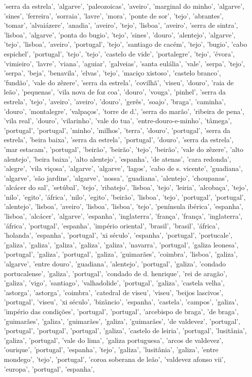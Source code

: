 \documentclass{article}
\begin{document}
\begin{itemize}
'serra da estrela', 'algarve', 'paleozoicas', 'aveiro', 'marginal do minho', 'algarve', 'sines', 'ferreira', 'sorraia', 'lavre', 'mora', 'ponte de sor', 'tejo', 'abrantes', 'tomar', 'alvaiázere', 'anadia', 'aveiro', 'tejo', 'lisboa', 'aveiro', 'serra de sintra', 'lisboa', 'algarve', 'ponta do bugio', 'tejo', 'sines', 'douro', 'alentejo', 'algarve', 'tejo', 'lisboa', 'aveiro', 'portugal', 'tejo', 'santiago de cacém', 'tejo', 'bugio', 'cabo espichel', 'portugal', 'tejo', 'tejo', 'castelo de vide', 'portalegre', 'tejo', 'évora', 'vimieiro', 'lavre', 'viana', 'aguiar', 'galveias', 'santa eulália', 'vale', 'serpa', 'tejo', 'serpa', 'beja', 'benavila', 'elvas', 'tejo', 'maciço xistoso', 'castelo branco', 'fundão', 'vale do zêzere', 'serra da estrela', 'covilhã', 'viseu', 'douro', 'raia de leão', 'pequenas', 'vila nova de foz coa', 'douro', 'vouga', 'pinhel', 'serra da estrela', 'tejo', 'aveiro', 'aveiro', 'douro', 'gerês', 'soajo', 'braga', 'caminha', 'douro', 'montalegre', 'valpaços', 'torre de d.', 'serra do marão', 'ribeira de pena', 'vila real', 'douro', 'vilarinho', 'vale do tua', 'entre-douro-e-minho', 'tâmega', 'portugal', 'portugal', 'minho', 'milhos', 'terra', 'douro', 'portugal', 'serra da estrela', 'beira baixa', 'serra da estrela', 'portugal', 'douro', 'serra da estrela', 'mar estacam', 'portugal', 'beirão', 'beirão', 'tejo', 'beirão', 'vale do zêzere', 'alto alentejo', 'beira baixa', 'alto alentejo', 'espanha', 'de atenas', 'cara redonda', 'alegre', 'vila viçosa', 'algarve', 'algarve', 'lagos', 'cabo de s. vicente', 'guadiana', 'algarve', 'são jardins', 'algarve', 'nossa', 'guadiana', 'alentejo', 'choupanas', 'alcácer do sal', 'setúbal', 'tejo', 'ribatejo', 'lisboa', 'tejo', 'leiria', 'alcobaça', 'tejo', 'nilo', 'egito', 'áfrica', 'nilo', 'egito', 'beirão', 'lisboa', 'tejo', 'portugal', 'portugal', 'alentejo', 'lisboa', 'aveiro', 'lisboa', 'lisboa', 'tejo', 'península ibérica', 'espanha', 'lisboa', 'alcácer', 'algarve', 'espanha', 'inglaterra', 'frança', 'frança', 'inglaterra', 'áfrica', 'portugal', 'espanha', 'império oriental', 'brasil', 'brasil', 'áfrica', 'holanda', 'espanha', 'portugal', 'xi século', 'espanha', 'portugal', 'portucale', 'galiza', 'galiza', 'galiza', 'galiza', 'galiza', 'navarra', 'portugal', 'galiza leonesa', 'portugal', 'galiza', 'portugal', 'galiza', 'guimarães', 'coimbra', 'lisboa', 'galiza', 'algarve', 'entre douro', 'guadiana', 'alentejo', 'portugal', 'galiza', 'condado portucalense', 'galiza', 'portugal', 'condado de d. henrique', 'rei de aragão', 'galiza', 'vigo', 'santiago', 'valhadolide', 'portugal', 'galiza', 'castela velha', 'astorga', 'astorga', 'coimbra', 'catedral de viseu', 'viseu', 'beijos lascivos', 'portugal', 'viseu', 'xi século', 'bizâncio', 'espanha', 'castela', 'campos', 'galiza', 'império das condições', 'portugal', 'portugal', 'arcebispo de braga', 'de braga', 'guimarães', 'galiza', 'guimarães', 'galiza', 'guimarães', 'de valdevez', 'portugal', 'portugal', 'portugal', 'portugal', 'galiza', 'castelo de leiria', 'portugal', 'lusitânia', 'galiza', 'portugal', 'vale do lima', 'galiza portuguesa', 'arcos de valdevez', 'ourique', 'portugal', 'espanha', 'tejo', 'galiza', 'lusitânia', 'galiza', 'entre mondego', 'tejo', 'portugal', 'coroa soberana de leão', 'valdevez afonso vii', 'europa', 'portugal', 'espanha', 
\end{itemize}
\end{document}
